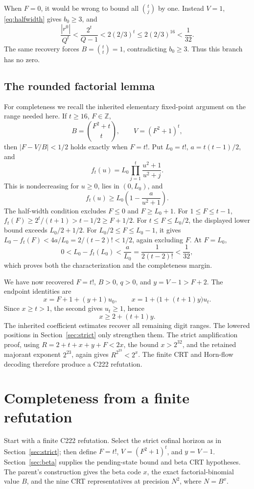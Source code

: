 \documentclass[11pt,letterpaper]{article}
\theoremstyle{definition}\newtheorem{definition}[theorem]{Definition}
\theoremstyle{remark}\newtheorem{remark}[theorem]{Remark}
\newcommand{\Z}{\mathbb Z}\newcommand{\N}{\mathbb N}
\begin{document}
When \(F=0\), it would be wrong to bound all \(\binom tj\) by one.
Instead \(V=1\), \eqref{eq:halfwidth} gives \(b_0\ge3\), and
\[
\frac{|r^0|}{Q^t}<\frac{2^t}{Q-1}
 <2(2/3)^t\le2(2/3)^{16}<\frac1{32}.
\]
The same recovery forces \(B=\binom tt=1\), contradicting \(b_0\ge3\).
Thus this branch has no zero.

\subsection{The rounded factorial lemma}

For completeness we recall the inherited elementary fixed-point argument
on the range needed here. If \(t\ge16\), \(F\in\Z\),
\[
B=\binom{F^2+t}{t},\qquad V=(F^2+1)^t,
\]
then \(|F-V/B|<1/2\) holds exactly when \(F=t!\). Put
\(L_0=t!\), \(a=t(t-1)/2\), and
\[
f_t(u)=L_0\prod_{j=1}^t\frac{u^2+1}{u^2+j}.
\]
This is nondecreasing for \(u\ge0\), lies in \((0,L_0)\), and
\[
f_t(u)\ge L_0\left(1-\frac{a}{u^2+1}\right).
\]
The half-width condition excludes \(F\le0\) and \(F\ge L_0+1\).
For \(1\le F\le t-1\),
\(f_t(F)\ge2^t/(t+1)>t-1/2\ge F+1/2\).
For \(t\le F\le L_0/2\), the displayed lower bound exceeds
\(L_0/2+1/2\). For \(L_0/2\le F\le L_0-1\), it gives
\(L_0-f_t(F)<4a/L_0=2/(t-2)!<1/2\), again excluding \(F\).
At \(F=L_0\),
\[
0<L_0-f_t(L_0)<\frac{a}{L_0}=
\frac1{2(t-2)!}<\frac1{32},
\]
which proves both the characterization and the completeness margin.

We have now recovered \(F=t!\), \(B>0\), \(q>0\), and \(y=V-1>F+2\).
The endpoint identities are
\[
x=F+1+(y+1)u_0,\qquad
x=1+\bigl(1+(t+1)y\bigr)u_t.
\]
Since \(x\ge t>1\), the second gives \(u_t\ge1\), hence
\begin{equation}\label{eq:endpoint}
x\ge2+(t+1)y.
\end{equation}
The inherited coefficient estimates recover all remaining digit ranges.
The lowered positions in Section~\ref{sec:strict} only strengthen them.
The strict amplification proof, using \(R=2+t+x+y+F<2x\), the bound
\(x>2^{32}\), and the retained majorant exponent \(2^{23}\), again gives
\(R^{2^{23}}<2^x\). The finite CRT and Horn-flow decoding therefore
produce a C222 refutation.

\section{Completeness from a finite refutation}
\label{sec:completeness}

Start with a finite C222 refutation. Select the strict cofinal horizon as
in Section~\ref{sec:strict}; then define \(F=t!\), \(V=(F^2+1)^t\),
and \(y=V-1\). Section~\ref{sec:beta} supplies the pending-state bound
and beta CRT hypotheses. The parent's construction gives the beta code
\(x\), the exact factorial-binomial value \(B\), and the nine CRT
representatives at precision \(N^2\), where \(N=B^x\).
\end{document}
